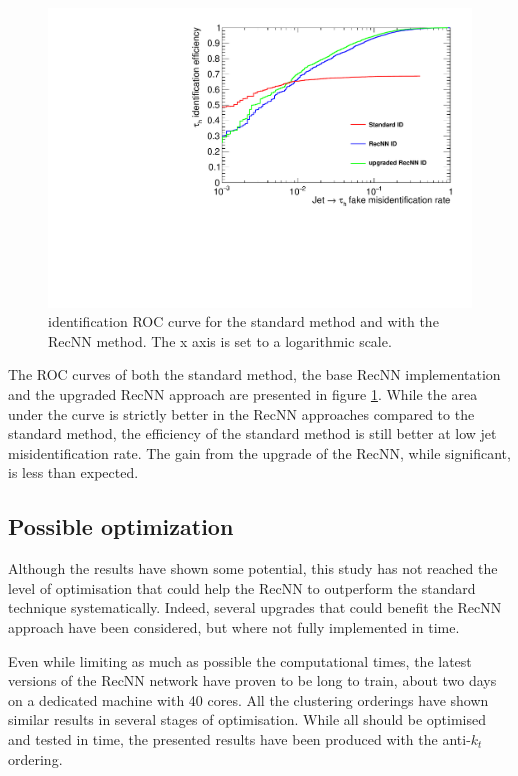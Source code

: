 \begin{figure}
    \centering
    \includegraphics[width=\textwidth]{Images/ROC_comp_all.pdf}
    \caption{\tauh identification ROC curve for the standard method and with the RecNN method. The x axis is set to a logarithmic scale.}
    \label{fig:RecNN_ROC}
\end{figure}

The ROC curves of both the standard method, the base RecNN implementation and the upgraded RecNN approach are presented in figure \ref{fig:RecNN_ROC}. While the area under the curve is strictly better in the RecNN approaches compared to the standard method, the efficiency of the standard method is still better at low jet misidentification rate. The gain from the upgrade of the RecNN, while significant, is less than expected. 


\subsection{Possible optimization}

Although the results have shown some potential, this study has not reached the level of optimisation that could help the RecNN to outperform the standard technique systematically. Indeed, several upgrades that could benefit the RecNN approach have been considered, but where not fully implemented in time. 

Even while limiting as much as possible the computational times, the latest versions of the RecNN network have proven to be long to train, about two days on a dedicated machine with 40 cores. All the clustering orderings have shown similar results in several stages of optimisation. While all should be optimised and tested in time, the presented results have been produced with the anti-$k_t$ ordering.

